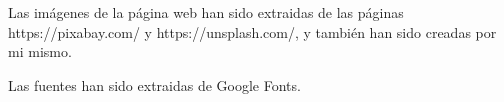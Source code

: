 Las imágenes de la página web han sido extraidas de las páginas https://pixabay.com/ y https://unsplash.com/, y también han sido creadas por mi mismo.

Las fuentes han sido extraidas de Google Fonts.
